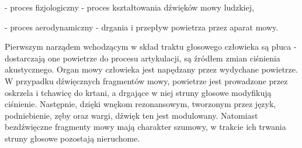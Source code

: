 \documentclass[eng,printmode]{mgr}
\begin{document}
	 - proces fizjologiczny - proces kształtowania dźwięków mowy ludzkiej,
	 
	 - proces aerodynamiczny - drgania i przepływ powietrza przez aparat mowy. 
  
  Pierwszym narządem wchodzącym w skład traktu głosowego człowieka są płuca - dostarczają one powietrze do procesu artykulacji, są źródłem zmian ciśnienia akustycznego. Organ mowy człowieka jest napędzany przez wydychane powietrze. W przypadku dźwięcznych fragmentów mowy, powietrze jest prowadzone przez oskrzela i tchawicę do krtani, a drgające w niej struny głosowe modyfikują ciśnienie. Następnie, dzięki wnękom rezonansowym, tworzonym przez język, podniebienie, zęby oraz wargi, dźwięk ten jest modulowany. Natomiast bezdźwięczne fragmenty mowy mają charakter szumowy, w trakcie ich trwania struny głosowe pozostają nieruchome.  
\end{document}

